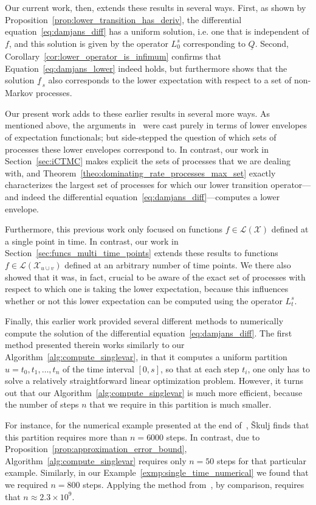 \documentclass[10pt,a4paper]{paper}
\theoremstyle{definition}
\newcommand{\states}{\mathcal{X}}
\newcommand{\gambles}{\mathcal{L}}
\newcommand{\gamblesX}{\gambles(\states)}
\newcommand{\lrate}{\underline{Q}}
\begin{document}
Our current work, then, extends these results in several ways. First, as shown by Proposition~\ref{prop:lower_transition_has_deriv}, the differential equation~\eqref{eq:damjans_diff} has a uniform solution, i.e. one that is independent of $f$, and this solution is given by the operator $L_0^s$ corresponding to $\lrate$. Second, Corollary~\ref{cor:lower_operator_is_infimum} confirms that Equation~\eqref{eq:damjans_lower} indeed holds, but furthermore shows that the solution $\underline{f}_{\,s}$ also corresponds to the lower expectation with respect to a set of non-Markov processes.

Our present work adds to these earlier results in several more ways. As mentioned above, the arguments in~\cite{Skulj:2015cq} were cast purely in terms of lower envelopes of expectation functionals; but side-stepped the question of which sets of processes these lower envelopes correspond to. In contrast, our work in Section~\ref{sec:iCTMC} makes explicit the sets of processes that we are dealing with, and Theorem~\ref{theo:dominating_rate_processes_max_set} exactly characterizes the largest set of processes for which our lower transition operator---and indeed the differential equation~\eqref{eq:damjans_diff}---computes a lower envelope.

Furthermore, this previous work only focused on functions $f\in\gamblesX$ defined at a single point in time. In contrast, our work in Section~\ref{sec:funcs_multi_time_points} extends these results to functions $f\in\gambles(\states_{u\cup v})$ defined at an arbitrary number of time points. We there also showed that it was, in fact, crucial to be aware of the exact set of processes with respect to which one is taking the lower expectation, because this influences whether or not this lower expectation can be computed using the operator $L_t^s$.

Finally, this earlier work provided several different methods to numerically compute the solution of the differential equation~\eqref{eq:damjans_diff}. The first method presented therein works similarly to our Algorithm~\ref{alg:compute_singlevar}, in that it computes a uniform partition $u=t_0,t_1,\ldots,t_n$ of the time interval $[0,s]$, so that at each step $t_i$, one only has to solve a relatively straightforward linear optimization problem. However, it turns out that our Algorithm~\ref{alg:compute_singlevar} is much more efficient, because the number of steps $n$ that we require in this partition is much smaller. 


For instance, for the numerical example presented at the end of~\cite[Section 4.1]{Skulj:2015cq}, {\v{S}}kulj finds that this partition requires more than $n=6000$ steps. In contrast, due to Proposition~\ref{prop:approximation_error_bound}, Algorithm~\ref{alg:compute_singlevar} requires only $n=50$ steps for that particular example. Similarly, in our Example~\ref{exmp:single_time_numerical} we found that we required $n=800$ steps. Applying the method from~\cite{Skulj:2015cq}, by comparison, requires that $n\approx 2.3\times 10^9$.
\end{document}
